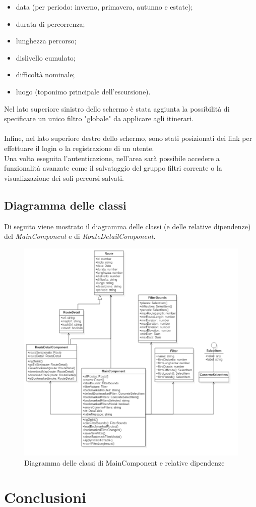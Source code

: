 \documentclass[11pt]{report}
\begin{document}
\begin{itemize}
	\item data (per periodo: inverno, primavera, autunno e estate);
	\item durata di percorrenza;
	\item lunghezza percorso;
	\item dislivello cumulato;
	\item difficoltà nominale;
	\item luogo (toponimo principale dell'escursione).
\end{itemize}
Nel lato superiore sinistro dello schermo è stata aggiunta la possibilità di specificare un unico filtro "globale" da applicare agli itinerari.
\\\\Infine, nel lato superiore destro dello schermo, sono stati posizionati dei link per effettuare il login o la registrazione di un utente.
\\Una volta eseguita l'autenticazione, nell'area sarà possibile accedere a funzionalità avanzate come il salvataggio del gruppo filtri corrente o la visualizzazione dei soli percorsi salvati.
\pagebreak
\subsection{Diagramma delle classi}
Di seguito viene mostrato il diagramma delle classi (e delle relative dipendenze) del \textit{MainComponent} e di \textit{RouteDetailComponent}.
\begin{figure}[h]
	\centering
	\includegraphics[scale=0.45]{ClassDiagram_Frontend}
	\caption{Diagramma delle classi di MainComponent e relative dipendenze \label{ClassDiagram_Frontend}}
\end{figure}
\pagebreak

\section{Conclusioni}
\end{document}
